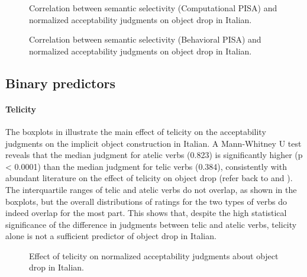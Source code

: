 \begin{figure}[htb]
\caption{Correlation between semantic selectivity (Computational PISA) and normalized acceptability judgments on object drop in Italian.}
    
\end{figure}

\begin{figure}[htb]
\caption{Correlation between semantic selectivity (Behavioral PISA) and normalized acceptability judgments on object drop in Italian.}
    
\end{figure}


\subsection{Binary predictors} 

\paragraph{Telicity}
The boxplots in  illustrate the main effect of telicity on the acceptability judgments on the implicit object construction in Italian. A Mann-Whitney U test reveals that the median judgment for atelic verbs (0.823) is significantly higher (p < 0.0001) than the median judgment for telic verbs (0.384), consistently with abundant literature on the effect of telicity on object drop (refer back to  and ).\\
The interquartile ranges of telic and atelic verbs do not overlap, as shown in the boxplots, but the overall distributions of ratings for the two types of verbs do indeed overlap for the most part. This shows that, despite the high statistical significance of the difference in judgments between telic and atelic verbs, telicity alone is not a sufficient predictor of object drop in Italian.

\begin{figure}[htb]
\caption{Effect of telicity on normalized acceptability judgments about object drop in Italian.}
    
\end{figure}

